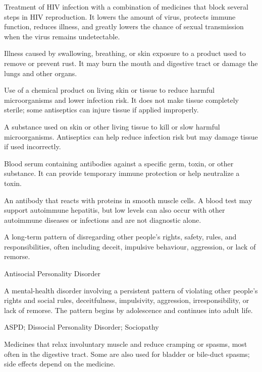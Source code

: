  Treatment of HIV infection with a combination of medicines that block several steps in HIV reproduction. It lowers the amount of virus, protects immune function, reduces illness, and greatly lowers the chance of sexual transmission when the virus remains undetectable.

 Illness caused by swallowing, breathing, or skin exposure to a product used to remove or prevent rust. It may burn the mouth and digestive tract or damage the lungs and other organs.

 Use of a chemical product on living skin or tissue to reduce harmful microorganisms and lower infection risk. It does not make tissue completely sterile; some antiseptics can injure tissue if applied improperly.

 A substance used on skin or other living tissue to kill or slow harmful microorganisms. Antiseptics can help reduce infection risk but may damage tissue if used incorrectly.

 Blood serum containing antibodies against a specific germ, toxin, or other substance. It can provide temporary immune protection or help neutralize a toxin.

 An antibody that reacts with proteins in smooth muscle cells. A blood test may support autoimmune hepatitis, but low levels can also occur with other autoimmune diseases or infections and are not diagnostic alone.

 A long-term pattern of disregarding other people’s rights, safety, rules, and responsibilities, often including deceit, impulsive behaviour, aggression, or lack of remorse.

\synonyms
Antisocial Personality Disorder

 A mental-health disorder involving a persistent pattern of violating other people’s rights and social rules, deceitfulness, impulsivity, aggression, irresponsibility, or lack of remorse. The pattern begins by adolescence and continues into adult life.

\synonyms
ASPD; Dissocial Personality Disorder; Sociopathy

 Medicines that relax involuntary muscle and reduce cramping or spasms, most often in the digestive tract. Some are also used for bladder or bile-duct spasms; side effects depend on the medicine.

